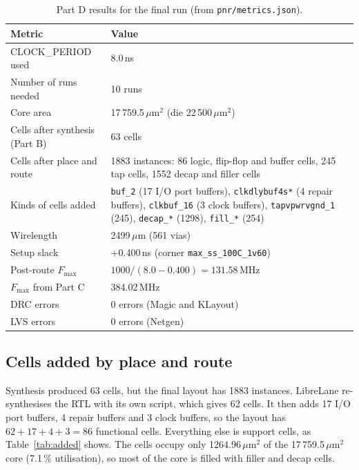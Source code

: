 \documentclass[10pt,a4paper,twocolumn]{article}
\newcommand{\um}{\,$\mu$m}
\newcommand{\umsq}{\,$\mu$m$^2$}
\newcommand{\Fmax}{$F_{\max}$}
\begin{document}
\begin{table}[!htbp]
\centering\footnotesize
\begin{tabularx}{\columnwidth}{>{\raggedright\arraybackslash}p{2.9cm}L}
\toprule
\textbf{Metric} & \textbf{Value} \\
\midrule
CLOCK\_PERIOD used & 8.0\,ns \\
Number of runs needed & 10 runs \\
Core area & 17\,759.5\umsq{} (die 22\,500\umsq) \\
Cells after synthesis (Part B) & 63 cells \\
Cells after place and route & 1883 instances: 86 logic, flip-flop and buffer cells, 245 tap cells, 1552 decap and filler cells \\
Kinds of cells added & \texttt{buf\_2} (17 I/O port buffers), \texttt{clkdlybuf4s*} (4 repair buffers), \texttt{clkbuf\_16} (3 clock buffers), \texttt{tapvpwrvgnd\_1} (245), \texttt{decap\_*} (1298), \texttt{fill\_*} (254) \\
Wirelength & 2499\um{} (561 vias) \\
Setup slack & +0.400\,ns (corner \texttt{max\_ss\_100C\_1v60}) \\
Post-route \Fmax & $1000/(8.0 - 0.400) = 131.58$\,MHz \\
\Fmax{} from Part C & 384.02\,MHz \\
DRC errors & 0 errors (Magic and KLayout) \\
LVS errors & 0 errors (Netgen) \\
\bottomrule
\end{tabularx}
\caption{Part D results for the final run (from \texttt{pnr/metrics.json}).}
\label{tab:partD}
\end{table}

\subsection{Cells added by place and route}
Synthesis produced 63 cells, but the final layout has 1883 instances. LibreLane re-synthesises the RTL with its own script, which gives 62 cells. It then adds 17 I/O port buffers, 4 repair buffers and 3 clock buffers, so the layout has $62 + 17 + 4 + 3 = 86$ functional cells. Everything else is support cells, as Table~\ref{tab:added} shows. The cells occupy only 1264.96\umsq{} of the 17\,759.5\umsq{} core (7.1\,\% utilisation), so most of the core is filled with filler and decap cells.
\end{document}
